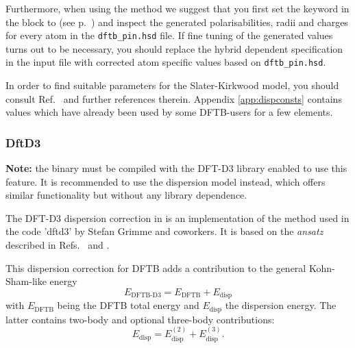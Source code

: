 Furthermore, when using the  method we
suggest that you first set the  keyword in the
 block to  (see p.~) and
inspect the generated polarisabilities, radii and charges for every
atom in the \verb|dftb_pin.hsd| file. If fine tuning of the generated
values turns out to be necessary, you should replace the hybrid
dependent specification in the input file with corrected atom
specific values based on \verb|dftb_pin.hsd|.

In order to find suitable parameters for the Slater-Kirkwood model,
you should consult Ref.~\cite{elstner-jcp-114-5149} and further
references therein. Appendix \ref{app:dispconsts} contains values
which have already been used by some DFTB-users for a few elements.

\subsubsection{DftD3}
\label{sec:dftbp.DftD3}

\textbf{Note:} the \dftbp{} binary must be compiled with the DFT-D3 library
enabled to use this feature. It is recommended to use the 
dispersion model instead, which offers similar functionality but without any library
dependence.

The DFT-D3 dispersion correction in \dftbp{} is an implementation of the method
used in the code 'dftd3' by Stefan Grimme and coworkers.  It is based on the
{\it ansatz} described in Refs.~\cite{grimme-jcp-132-154104} and
\cite{grimme-jcp-32-1456-1465}.


This dispersion correction for DFTB adds a contribution to the general
Kohn-Sham-like energy
\begin{equation*}
  E_{\text{DFTB-D3}} = E_{\text{DFTB}} + E_{\text{disp}}
\end{equation*}
with $E_{\text{DFTB}}$ being the DFTB total energy and $E_{\text{disp}}$ the
dispersion energy. The latter contains two-body and optional three-body
contributions:
\begin{equation*}
  E_{\text{disp}} = E_{\text{disp}}^{(2)} + E_{\text{disp}}^{(3)}.
\end{equation*}

